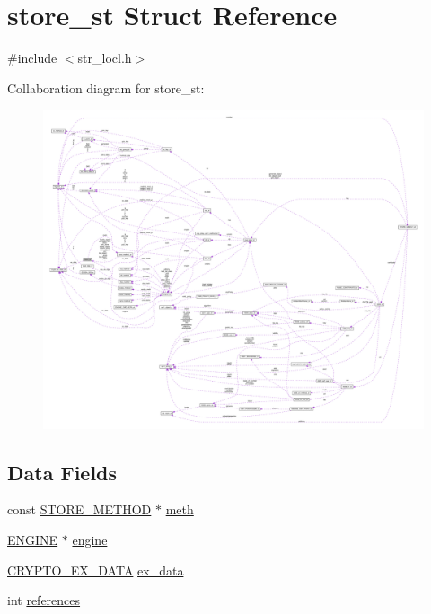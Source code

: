 \hypertarget{structstore__st}{}\section{store\+\_\+st Struct Reference}
\label{structstore__st}


{\ttfamily \#include $<$str\+\_\+locl.\+h$>$}



Collaboration diagram for store\+\_\+st\+:\nopagebreak
\begin{figure}[H]
\begin{center}
\leavevmode
\includegraphics[width=350pt]{structstore__st__coll__graph}
\end{center}
\end{figure}
\subsection*{Data Fields}
\begin{DoxyCompactItemize}
\item 
const \hyperlink{crypto_2ossl__typ_8h_a2b7bd26e18fe62b90bf46b9d8883386f}{S\+T\+O\+R\+E\+\_\+\+M\+E\+T\+H\+OD} $\ast$ \hyperlink{structstore__st_ae284fdb2c7bd469db381812a348e31bf}{meth}
\item 
\hyperlink{crypto_2ossl__typ_8h_abac45b251498719318e60ab8d6192510}{E\+N\+G\+I\+NE} $\ast$ \hyperlink{structstore__st_a4eb35fa252ec72ad7c53a4c8d30a7fd3}{engine}
\item 
\hyperlink{crypto_2ossl__typ_8h_a7eaff1c18057495d8af18f22d1370b51}{C\+R\+Y\+P\+T\+O\+\_\+\+E\+X\+\_\+\+D\+A\+TA} \hyperlink{structstore__st_ac3e4fd59d6ee44a81f3a58114613c1e2}{ex\+\_\+data}
\item 
int \hyperlink{structstore__st_a146fdb34d9a909e530adf8b189481195}{references}
\end{DoxyCompactItemize}


